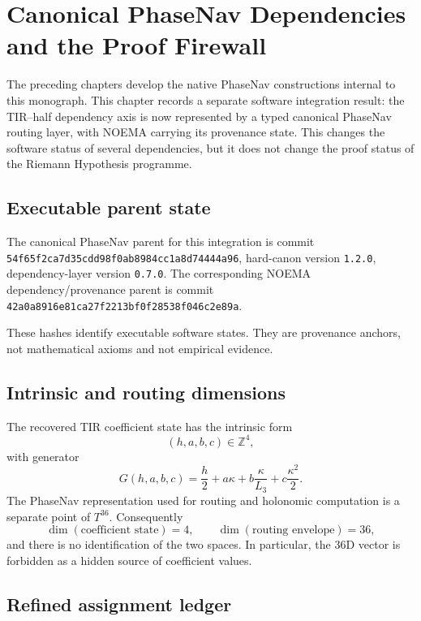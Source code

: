 \chapter{Canonical PhaseNav Dependencies and the Proof Firewall}
\label{ch:phasenav-dependency-canon}

The preceding chapters develop the native PhaseNav constructions internal to
this monograph.  This chapter records a separate software integration result:
the TIR--half dependency axis is now represented by a typed canonical PhaseNav
routing layer, with NOEMA carrying its provenance state.  This changes the
software status of several dependencies, but it does not change the proof
status of the Riemann Hypothesis programme.

\section{Executable parent state}

The canonical PhaseNav parent for this integration is commit
\texttt{54f65f2c\allowbreak a7d35cdd\allowbreak 98f0ab89\allowbreak 84cc1a8d\allowbreak 74444a96},
hard-canon version \texttt{1.2.0}, dependency-layer version \texttt{0.7.0}.
The corresponding NOEMA dependency/provenance parent is commit
\texttt{42a0a891\allowbreak 6e81ca27\allowbreak f2213bf0\allowbreak f28538f0\allowbreak 46c2e89a}.

These hashes identify executable software states.  They are provenance anchors,
not mathematical axioms and not empirical evidence.

\section{Intrinsic and routing dimensions}

The recovered TIR coefficient state has the intrinsic form
\[
  (h,a,b,c)\in\mathbb{Z}^{4},
\]
with generator
\[
  G(h,a,b,c)
  =\frac{h}{2}+a\kappa+b\frac{\kappa}{L_3}
   +c\frac{\kappa^2}{2}.
\]
The PhaseNav representation used for routing and holonomic computation is a
separate point of $T^{36}$.  Consequently
\[
  \dim(\text{coefficient state})=4,
  \qquad
  \dim(\text{routing envelope})=36,
\]
and there is no identification of the two spaces.  In particular, the 36D
vector is forbidden as a hidden source of coefficient values.

\section{Refined assignment ledger}

